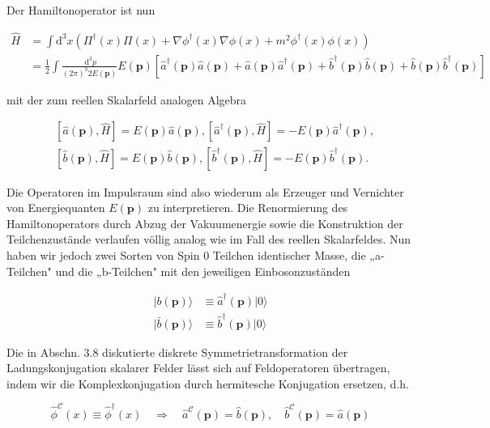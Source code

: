 \documentclass[10pt, letterpaper]{article}
\begin{document}
Der Hamiltonoperator ist nun

$$
\begin{aligned}
\hat{H} & =\int \mathrm{d}^{3} x\left(\Pi^{\dagger}(x) \Pi(x)+\nabla \phi^{\dagger}(x) \nabla \phi(x)+m^{2} \phi^{\dagger}(x) \phi(x)\right) \\
& =\frac{1}{2} \int \frac{\mathrm{~d}^{3} p}{(2 \pi)^{3} 2 E(\mathbf{p})} E(\mathbf{p})\left[\hat{a}^{\dagger}(\mathbf{p}) \hat{a}(\mathbf{p})+\hat{a}(\mathbf{p}) \hat{a}^{\dagger}(\mathbf{p})+\hat{b}^{\dagger}(\mathbf{p}) \hat{b}(\mathbf{p})+\hat{b}(\mathbf{p}) \hat{b}^{\dagger}(\mathbf{p})\right]
\end{aligned}
$$

mit der zum reellen Skalarfeld analogen Algebra

$$
\begin{aligned}
& {[\hat{a}(\mathbf{p}), \hat{H}]=E(\mathbf{p}) \hat{a}(\mathbf{p}),\left[\hat{a}^{\dagger}(\mathbf{p}), \hat{H}\right]=-E(\mathbf{p}) \hat{a}^{\dagger}(\mathbf{p}),} \\
& {[\hat{b}(\mathbf{p}), \hat{H}]=E(\mathbf{p}) \hat{b}(\mathbf{p}),\left[\hat{b}^{\dagger}(\mathbf{p}), \hat{H}\right]=-E(\mathbf{p}) \hat{b}^{\dagger}(\mathbf{p}) .}
\end{aligned}
$$

Die Operatoren im Impulsraum sind also wiederum als Erzeuger und Vernichter von Energiequanten $E(\mathbf{p})$ zu interpretieren. Die Renormierung des Hamiltonoperators durch Abzug der Vakuumenergie sowie die Konstruktion der Teilchenzustände verlaufen völlig analog wie im Fall des reellen Skalarfeldes. Nun haben wir jedoch zwei Sorten von Spin 0 Teilchen identischer Masse, die „a-Teilchen" und die „b-Teilchen" mit den jeweiligen Einbosonzuständen

$$
\begin{aligned}
|b(\mathbf{p})\rangle & \equiv \hat{a}^{\dagger}(\mathbf{p})|0\rangle \\
|\bar{b}(\mathbf{p})\rangle & \equiv \hat{b}^{\dagger}(\mathbf{p})|0\rangle
\end{aligned}
$$

Die in Abschn. 3.8 diskutierte diskrete Symmetrietransformation der Ladungskonjugation skalarer Felder lässt sich auf Feldoperatoren übertragen, indem wir die Komplexkonjugation durch hermitesche Konjugation ersetzen, d.h.

$$
\hat{\phi}^{\mathcal{C}}(x) \equiv \hat{\phi}^{\dagger}(x) \quad \Rightarrow \quad \hat{a}^{\mathcal{C}}(\mathbf{p})=\hat{b}(\mathbf{p}), \quad \hat{b}^{\mathcal{C}}(\mathbf{p})=\hat{a}(\mathbf{p})
$$
\end{document}
